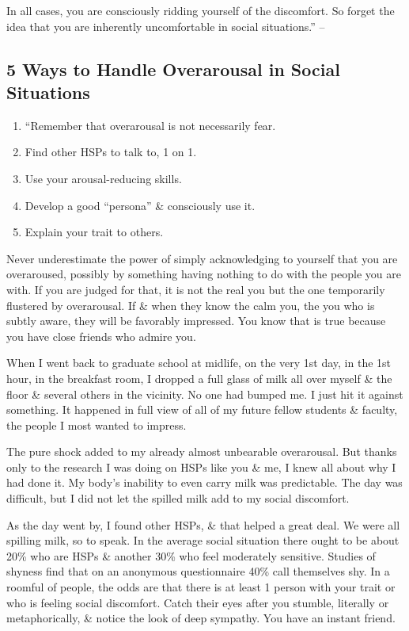 \documentclass{article}
\numberwithin{equation}{section}
\begin{document}
In all cases, you are consciously ridding yourself of the discomfort. So forget the idea that you are inherently uncomfortable in social situations.'' -- \cite[pp. 126--127]{Aron2013}

\subsection{5 Ways to Handle Overarousal in Social Situations}

\begin{enumerate}
	\item ``Remember that overarousal is not necessarily fear.
	\item Find other HSPs to talk to, 1 on 1.
	\item Use your arousal-reducing skills.
	\item Develop a good ``persona'' \& consciously use it.
	\item Explain your trait to others.
\end{enumerate}
Never underestimate the power of simply acknowledging to yourself that you are overaroused, possibly by something having nothing to do with the people you are with. If you are judged for that, it is not the real you but the one temporarily flustered by overarousal. If \& when they know the calm you, the you who is subtly aware, they will be favorably impressed. You know that is true because you have close friends who admire you.

When I went back to graduate school at midlife, on the very 1st day, in the 1st hour, in the breakfast room, I dropped a full glass of milk all over myself \& the floor \& several others in the vicinity. No one had bumped me. I just hit it against something. It happened in full view of all of my future fellow students \& faculty, the people I most wanted to impress.

The pure shock added to my already almost unbearable overarousal. But thanks only to the research I was doing on HSPs like you \& me, I knew all about why I had done it. My body's inability to even carry milk was predictable. The day was difficult, but I did not let the spilled milk add to my social discomfort.

As the day went by, I found other HSPs, \& that helped a great deal. We were all spilling milk, so to speak. In the average social situation there ought to be about 20\% who are HSPs \& another 30\% who feel moderately sensitive. Studies of shyness find that on an anonymous questionnaire 40\% call themselves shy. In a roomful of people, the odds are that there is at least 1 person with your trait or who is feeling social discomfort. Catch their eyes after you stumble, literally or metaphorically, \& notice the look of deep sympathy. You have an instant friend.
\end{document}
